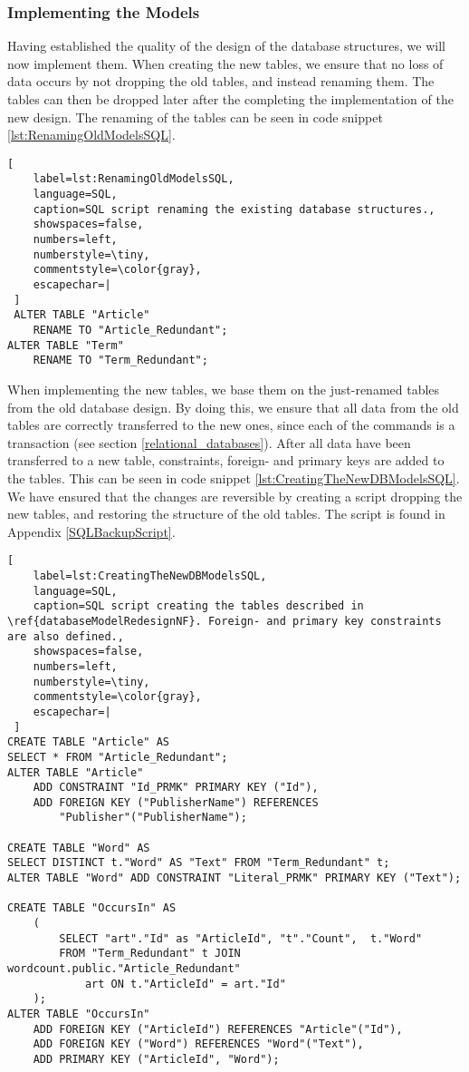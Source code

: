 \subsubsection*{Implementing the Models}\label{implementing_new_WC_DB_models}
Having established the quality of the design of the database structures, we will now implement them.
When creating the new tables, we ensure that no loss of data occurs by not dropping the old tables, and instead renaming them. 
The tables can then be dropped later after the completing the implementation of the new design.
The renaming of the tables can be seen in code snippet \ref{lst:RenamingOldModelsSQL}.

\begin{lstlisting}[
    label=lst:RenamingOldModelsSQL,
    language=SQL,
    caption=SQL script renaming the existing database structures.,
    showspaces=false,
    numbers=left,
    numberstyle=\tiny,
    commentstyle=\color{gray},
    escapechar=|
 ]
 ALTER TABLE "Article"
    RENAME TO "Article_Redundant";
ALTER TABLE "Term"
    RENAME TO "Term_Redundant";
\end{lstlisting}

When implementing the new tables, we base them on the just-renamed tables from the old database design.
By doing this, we ensure that all data from the old tables are correctly transferred to the new ones, since each of the commands is a transaction (see section \ref{relational_databases}).
After all data have been transferred to a new table, constraints, foreign- and primary keys are added to the tables. 
This can be seen in code snippet \ref{lst:CreatingTheNewDBModelsSQL}.
We have ensured that the changes are reversible by creating a script dropping the new tables, and restoring the structure of the old tables.
The script is found in Appendix \ref{SQLBackupScript}.

\begin{lstlisting}[
    label=lst:CreatingTheNewDBModelsSQL,
    language=SQL,
    caption=SQL script creating the tables described in \ref{databaseModelRedesignNF}. Foreign- and primary key constraints are also defined.,
    showspaces=false,
    numbers=left,
    numberstyle=\tiny,
    commentstyle=\color{gray},
    escapechar=|
 ]
CREATE TABLE "Article" AS
SELECT * FROM "Article_Redundant";
ALTER TABLE "Article"
    ADD CONSTRAINT "Id_PRMK" PRIMARY KEY ("Id"),
    ADD FOREIGN KEY ("PublisherName") REFERENCES 
        "Publisher"("PublisherName");

CREATE TABLE "Word" AS
SELECT DISTINCT t."Word" AS "Text" FROM "Term_Redundant" t;
ALTER TABLE "Word" ADD CONSTRAINT "Literal_PRMK" PRIMARY KEY ("Text");

CREATE TABLE "OccursIn" AS
    (
        SELECT "art"."Id" as "ArticleId", "t"."Count",  t."Word"
        FROM "Term_Redundant" t JOIN wordcount.public."Article_Redundant" 
            art ON t."ArticleId" = art."Id"
    );
ALTER TABLE "OccursIn"
    ADD FOREIGN KEY ("ArticleId") REFERENCES "Article"("Id"),
    ADD FOREIGN KEY ("Word") REFERENCES "Word"("Text"),
    ADD PRIMARY KEY ("ArticleId", "Word");
\end{lstlisting}

